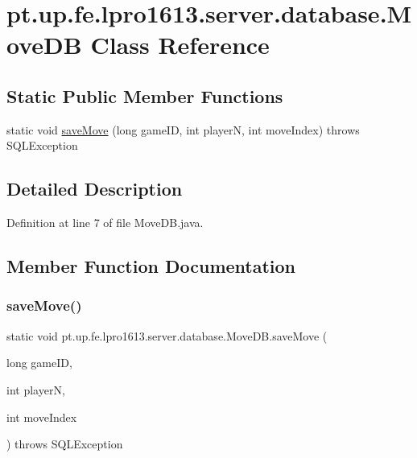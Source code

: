 \hypertarget{classpt_1_1up_1_1fe_1_1lpro1613_1_1server_1_1database_1_1_move_d_b}{}\section{pt.\+up.\+fe.\+lpro1613.\+server.\+database.\+Move\+DB Class Reference}
\label{classpt_1_1up_1_1fe_1_1lpro1613_1_1server_1_1database_1_1_move_d_b}
\subsection*{Static Public Member Functions}
\begin{DoxyCompactItemize}
\item 
static void \hyperlink{classpt_1_1up_1_1fe_1_1lpro1613_1_1server_1_1database_1_1_move_d_b_ab8f0aae8311817ab4ac56a52f50dbe22}{save\+Move} (long game\+ID, int playerN, int move\+Index)  throws S\+Q\+L\+Exception 
\end{DoxyCompactItemize}


\subsection{Detailed Description}


Definition at line 7 of file Move\+D\+B.\+java.



\subsection{Member Function Documentation}
\hypertarget{classpt_1_1up_1_1fe_1_1lpro1613_1_1server_1_1database_1_1_move_d_b_ab8f0aae8311817ab4ac56a52f50dbe22}{}\label{classpt_1_1up_1_1fe_1_1lpro1613_1_1server_1_1database_1_1_move_d_b_ab8f0aae8311817ab4ac56a52f50dbe22} 
\subsubsection{\texorpdfstring{save\+Move()}{saveMove()}}
{\footnotesize\ttfamily static void pt.\+up.\+fe.\+lpro1613.\+server.\+database.\+Move\+D\+B.\+save\+Move (\begin{DoxyParamCaption}\item[{long}]{game\+ID,  }\item[{int}]{playerN,  }\item[{int}]{move\+Index }\end{DoxyParamCaption}) throws S\+Q\+L\+Exception\hspace{0.3cm}{\ttfamily [static]}}




